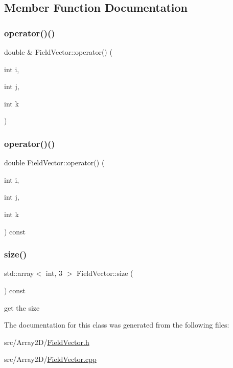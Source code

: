 \subsection{Member Function Documentation}
\mbox{\label{classFieldVector_a09bf710dc0e18a99985eac4425aa27cb}} 
\subsubsection{\texorpdfstring{operator()()}{operator()()}\hspace{0.1cm}{\footnotesize\ttfamily [1/2]}}
{\footnotesize\ttfamily double \& Field\+Vector\+::operator() (\begin{DoxyParamCaption}\item[{int}]{i,  }\item[{int}]{j,  }\item[{int}]{k }\end{DoxyParamCaption})}

\mbox{\label{classFieldVector_acabecdf0d9848a128c76d53911f7c600}} 
\subsubsection{\texorpdfstring{operator()()}{operator()()}\hspace{0.1cm}{\footnotesize\ttfamily [2/2]}}
{\footnotesize\ttfamily double Field\+Vector\+::operator() (\begin{DoxyParamCaption}\item[{int}]{i,  }\item[{int}]{j,  }\item[{int}]{k }\end{DoxyParamCaption}) const}

\mbox{\label{classFieldVector_a3129b0ce1a664aaf667c2fc7229321f2}} 
\subsubsection{\texorpdfstring{size()}{size()}}
{\footnotesize\ttfamily std\+::array$<$ int, 3 $>$ Field\+Vector\+::size (\begin{DoxyParamCaption}{ }\end{DoxyParamCaption}) const}



get the size 



The documentation for this class was generated from the following files\+:\begin{DoxyCompactItemize}
\item 
src/\+Array2\+D/\mbox{\hyperlink{FieldVector_8h}{Field\+Vector.\+h}}\item 
src/\+Array2\+D/\mbox{\hyperlink{FieldVector_8cpp}{Field\+Vector.\+cpp}}\end{DoxyCompactItemize}
